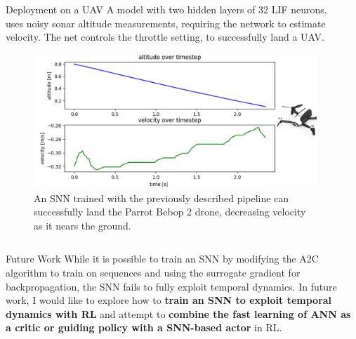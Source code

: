 \documentclass[final,35pt]{beamer}
\newlength{\sepwidth}
\newlength{\colwidth}
\newcommand{\separatorcolumn}{\begin{column}{\sepwidth}\end{column}}
\begin{document}
\begin{frame}
\begin{columns}[t]
\begin{column}{\colwidth}
\begin{block}{{\fontsize{48}{40}\selectfont Deployment on a UAV}}
{
A model with two hidden layers of 32 LIF neurons, uses noisy sonar altitude measurements, requiring the network to estimate velocity. The net controls the throttle setting, to successfully land a UAV.
}
\begin{figure}
    \centering
    \includegraphics[width=.8\textwidth]{figures/drone_landing.png}
    \caption{{\fontsize{28}{40}\selectfont An SNN trained with the previously described pipeline can successfully land the Parrot Bebop 2 drone, decreasing velocity as it nears the ground.}}
    \label{fig:enter-label}
\end{figure}
\end{block}

\vspace{-0.5cm}



\end{column}

\separatorcolumn
\end{columns}
  \begin{block}{{\fontsize{48}{40}\selectfont Future Work}}
  {
While it is possible to train an SNN by modifying the A2C algorithm to train on sequences and using the surrogate gradient for backpropagation, the SNN fails to fully exploit temporal dynamics. In future work, I would like to explore how to\textbf{ train an SNN to exploit temporal dynamics with RL} and attempt to \textbf{combine the fast learning of ANN as a critic or guiding policy with a SNN-based actor} in RL.
}


\end{block}
\end{frame}
\end{document}
